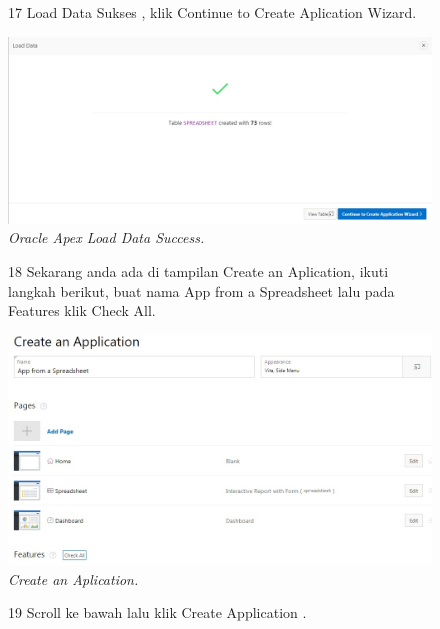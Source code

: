 \begin{enumerate}
\begin{figure}
\item[17] Load Data Sukses , klik Continue to Create Aplication Wizard.

    \begin{center}
\includegraphics[scale=0.4]{figures/login6.jpg}
    \caption{\textit{Oracle Apex Load Data Success.}}
        \end{center}
\label{gambar}
\end{figure}

\begin{figure}
\item[18] Sekarang anda ada di tampilan Create an Aplication, ikuti langkah berikut, buat nama App from a Spreadsheet lalu pada Features klik Check All.

    \begin{center}
\includegraphics[scale=0.4]{figures/create1.jpg}
    \caption{\textit{Create an Aplication.}}
        \end{center}
\label{gambar}
\end{figure}


\begin{figure}
\item[19]Scroll ke bawah lalu klik Create Application .


\end{figure}
\end{enumerate}
